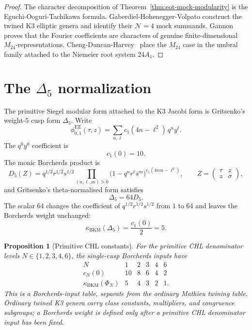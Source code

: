 \documentclass[11pt]{article}
\newtheorem{proposition}[theorem]{Proposition}
\newcommand{\kBKM}{\kappa_{\mathrm{BKM}}}
\begin{document}
\begin{proof}
The character decomposition of Theorem~\ref{thm:eot-mock-modularity}
is the Eguchi-Ooguri-Tachikawa formula. Gaberdiel-Hohenegger-Volpato
\cite{GaberdielHoheneggerVolpato2010} construct the twined K3
elliptic genera and identify their $\mathcal N=4$ mock summands.
Gannon~\cite{Gannon2016} proves that the Fourier coefficients are
characters of genuine finite-dimensional $M_{24}$-representations.
Cheng-Duncan-Harvey~\cite{ChengDuncanHarvey2014} place the
$M_{24}$ case in the umbral family attached to the Niemeier root
system $24A_1$.
\end{proof}

\section{The \texorpdfstring{$\Delta_5$}{Delta5} normalization}
\label{sec:delta5}

The primitive Siegel modular form attached to the K3 Jacobi form is
Gritsenko's weight-$5$ cusp form $\Delta_5$. Write
\[
  \phi_{0,1}^{\mathrm{EZ}}(\tau,z)
  =\sum_{n,\ell}c_1(4n-\ell^2)\,q^n y^\ell .
\]
The $q^0y^0$ coefficient is
\[
  c_1(0)=10.
\]
The monic Borcherds product is
\[
  D_5(Z)
  =
  q^{1/2}r^{1/2}s^{1/2}
  \prod_{(n,\ell,m)>0}
  \bigl(1-q^n r^\ell s^m\bigr)^{c_1(4nm-\ell^2)},
  \qquad Z=\begin{pmatrix}\tau&z\\ z&\sigma\end{pmatrix},
\]
and Gritsenko's theta-normalised form satisfies
\[
  \Delta_5=64D_5 .
\]
The scalar $64$ changes the coefficient of
$q^{1/2}r^{1/2}s^{1/2}$ from $1$ to $64$ and leaves the Borcherds
weight unchanged:
\[
  \kBKM(\Delta_5)=\frac{c_1(0)}{2}=5.
\]

\begin{proposition}[Primitive CHL constants]
\label{prop:primitive-chl-constants}
For the primitive CHL denominator levels
$N\in\{1,2,3,4,6\}$, the single-cusp Borcherds inputs have
\[
\begin{array}{c|ccccc}
N & 1 & 2 & 3 & 4 & 6\\
\hline
c_N(0) & 10 & 8 & 6 & 4 & 2\\
\kBKM(\Phi_N) & 5 & 4 & 3 & 2 & 1 .
\end{array}
\]
This is a Borcherds-input table, separate from the ordinary Mathieu
twining table. Ordinary twined K3 genera carry class constants,
multipliers, and congruence subgroups; a Borcherds weight is defined
only after a primitive CHL denominator input has been fixed.
\end{proposition}
\end{document}
